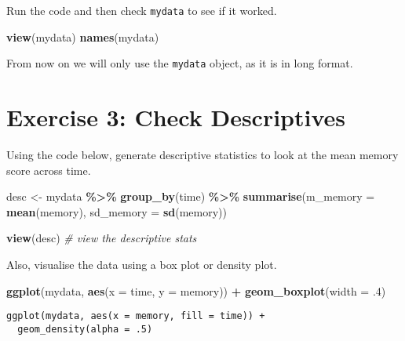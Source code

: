 \documentclass[
]{book}
\newenvironment{Shaded}{\begin{snugshade}}{\end{snugshade}}
\newcommand{\AttributeTok}[1]{\textcolor[rgb]{0.13,0.29,0.53}{#1}}
\newcommand{\CommentTok}[1]{\textcolor[rgb]{0.56,0.35,0.01}{\textit{#1}}}
\newcommand{\DecValTok}[1]{\textcolor[rgb]{0.00,0.00,0.81}{#1}}
\newcommand{\FunctionTok}[1]{\textcolor[rgb]{0.13,0.29,0.53}{\textbf{#1}}}
\newcommand{\NormalTok}[1]{#1}
\newcommand{\OtherTok}[1]{\textcolor[rgb]{0.56,0.35,0.01}{#1}}
\newcommand{\SpecialCharTok}[1]{\textcolor[rgb]{0.81,0.36,0.00}{\textbf{#1}}}
\let\oldsection\section
\renewcommand{\section}{\needspace{5\baselineskip}\oldsection}
\begin{document}
Run the code and then check \texttt{mydata} to see if it worked.

\begin{Shaded}
\begin{Highlighting}[]
\FunctionTok{view}\NormalTok{(mydata)}
\FunctionTok{names}\NormalTok{(mydata)}
\end{Highlighting}
\end{Shaded}

From now on we will only use the \texttt{mydata} object, as it is in long format.

\section{Exercise 3: Check Descriptives}\label{exercise-3-check-descriptives}

Using the code below, generate descriptive statistics to look at the mean memory score across time.

\begin{Shaded}
\begin{Highlighting}[]
\NormalTok{desc }\OtherTok{\textless{}{-}}\NormalTok{ mydata }\SpecialCharTok{\%\textgreater{}\%}
  \FunctionTok{group\_by}\NormalTok{(time) }\SpecialCharTok{\%\textgreater{}\%}
  \FunctionTok{summarise}\NormalTok{(}\AttributeTok{m\_memory =} \FunctionTok{mean}\NormalTok{(memory),}
            \AttributeTok{sd\_memory =} \FunctionTok{sd}\NormalTok{(memory))}
            
\FunctionTok{view}\NormalTok{(desc) }\CommentTok{\# view the descriptive stats}
\end{Highlighting}
\end{Shaded}

Also, visualise the data using a box plot or density plot.

\begin{Shaded}
\begin{Highlighting}[]
\FunctionTok{ggplot}\NormalTok{(mydata, }\FunctionTok{aes}\NormalTok{(}\AttributeTok{x =}\NormalTok{ time, }\AttributeTok{y =}\NormalTok{ memory)) }\SpecialCharTok{+}
  \FunctionTok{geom\_boxplot}\NormalTok{(}\AttributeTok{width =}\NormalTok{ .}\DecValTok{4}\NormalTok{)}
\end{Highlighting}
\end{Shaded}

\begin{verbatim}
ggplot(mydata, aes(x = memory, fill = time)) +
  geom_density(alpha = .5)
\end{verbatim}
\end{document}
